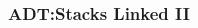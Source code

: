 
\begin{frame}[fragile]
\frametitle{ADT:Stacks Linked II}
\begin{columns}[T]

\begin{column}{0.45\textwidth}

\end{column}

\pause
\begin{column}{0.45\textwidth}

\end{column}

\end{columns}
\end{frame}
